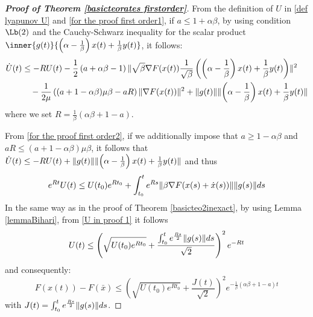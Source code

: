 \documentclass[reqno]{amsart}
\theoremstyle{plain}
\theoremstyle{definition}
\theoremstyle{remark}
\DeclarePairedDelimiter{\norm}{\lVert}{\rVert}	%
\begin{document}
\begin{proof}[\textbf{Proof of Theorem \ref{basicteorates firstorder}}]
From the definition of $U$ in \eqref{def lyapunov U} and \eqref{for the proof first order1}, if $a\leq 1+\alpha\beta$, by using condition \hyperref[PL]{$\Lb(2)$}  and the Cauchy-Schwarz inequality for the scalar product $\inner{g(t)}{\left(\alpha-\frac{1}{\beta}\right)x(t) + \frac{1}{\beta}y(t)}$, it follows:
\begin{equation}\label{for the proof first order2}
	\begin{aligned}
		\dot{U}(t)
		& \leq -RU(t) -\frac{1}{2}\left(a+\alpha\beta-1\right)\norm{\sqrt{\beta}\nabla F(x(t))\frac{1}{\sqrt{\beta}}\left(\left(\alpha-\frac{1}{\beta}\right)x(t) + \frac{1}{\beta}y(t)\right)}^{2}  \\
		& \quad  -\frac{1}{2\mu}\left((a+1-\alpha\beta)\mu\beta-aR\right)\norm{\nabla F(x(t))}^{2} +\norm{g(t)}\norm{\left(\alpha-\frac{1}{\beta}\right)x(t) + \frac{1}{\beta}y(t)}
	\end{aligned}
\end{equation}
where we set $R=\frac{1}{\beta}(\alpha\beta+1-a)$.
	
From \eqref{for the proof first order2}, if we additionally impose that $a\geq 1-\alpha\beta$ and $aR\leq (a+1-\alpha\beta)\mu\beta$, it follows that $\dot{U}(t) \leq -RU(t) + \norm{g(t)}\norm{\left(\alpha-\frac{1}{\beta}\right)x(t) + \frac{1}{\beta}y(t)}$ and thus
\begin{equation}\label{U in proof 1}
	e^{Rt}U(t) \leq U(t_{0})e^{Rt_{0}} +\int_{t_{0}}^{t}e^{Rs}\norm{\beta\nabla F(x(s)+\dot{x}(s))}\norm{g(s)} ds
\end{equation}
In the same way as in the proof of Theorem \ref{basicteo2inexact}, by using Lemma \ref{lemmaBihari},  from \eqref{U in proof 1} it follows
\begin{equation}
	U(t) \leq \left(\sqrt{U(t_{0})e^{Rt_{0}}} + \frac{\int_{t_{0}}^{t}e^{\frac{Rs}{2}}\norm{g(s)}ds}{\sqrt{2}}\right)^{2}e^{-Rt}
\end{equation}
and consequently:
\begin{equation}\label{eq: geometric first in the proof}
	F(x(t))-F(\bar{x}) \leq \left(\sqrt{U(t_{0})e^{Rt_{0}}} + \frac{J(t)}{\sqrt{2}}\right)^{2}e^{-\frac{1}{\beta}(\alpha\beta+1-a)t}
\end{equation}
with $J(t)=\int_{t_{0}}^{t}e^{\frac{Rs}{2}}\norm{g(s)}ds$.


\end{proof}
\end{document}
